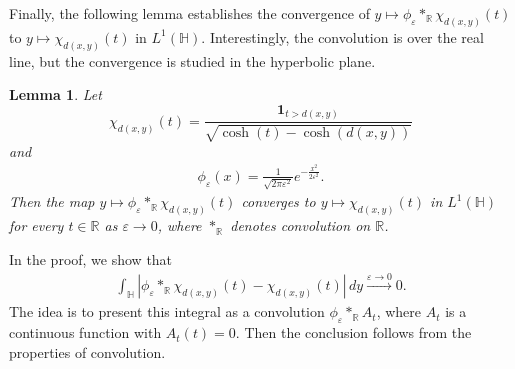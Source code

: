 \documentclass[11pt,twoside,reqno]{amsart} \usepackage{a4wide} \usepackage[T1]{fontenc} \usepackage[utf8]{inputenc} \usepackage{soul}  \usepackage{amsmath} \usepackage{amsfonts} \usepackage{amssymb} \usepackage{mathtools} \usepackage{amsthm} \usepackage{xcolor} \usepackage{graphicx} \usepackage{hyperref} \usepackage{standalone} \usepackage{esint} \usepackage{comment} \usepackage[left=2.3cm,top=3cm,right=2.3cm]{geometry} \usepackage{bm} \usepackage{svg} \usepackage{float} \numberwithin{equation}{section} \theoremstyle{plain} \newtheorem{thm}{Theorem}[section] \newtheorem{theorem}[thm]{Theorem} \newtheorem*{theorem*}{Theorem}\newtheorem{conj}[thm]{Conjecture} \newtheorem{lemma}[thm]{Lemma} \newtheorem{prop}[thm]{Proposition} \newtheorem{proposition}[thm]{Proposition} \newtheorem{cor}[thm]{Corollary} \newtheorem{question}[thm]{Question} \newtheorem{corollary}[thm]{Corollary} \newtheorem{assumption}[thm]{Assumption} \theoremstyle{definition} \newtheorem{defn}[thm]{Definition} \newtheorem{choice}[thm]{Choice} \newtheorem{definition}[thm]{Definition} \newtheorem{ex}[thm]{Example} \newtheorem{notation}[thm]{Notation} \newtheorem*{ack}{Acknowledgements} \theoremstyle{remark} \newtheorem{remark}[thm]{Remark} \newtheorem{bigremark}[thm]{Remark} \usepackage{xcolor} \newcommand{\red}[1]{ {\color{Red}#1} } \newcommand{\blue}[1]{ {\color{Blue}#1} } \author{Kai Hippi} \address{Aalto University, Espoo, Finland} \email{kai.hippi@aalto.fi}
\begin{document}
Finally, the following lemma establishes the convergence of $y \mapsto \phi_{\varepsilon} \ast_{\mathbb{R}} \chi_{d(x,y)}(t)$ to $y \mapsto \chi_{d(x,y)}(t)$ in $L^1(\mathbb{H})$. Interestingly, the convolution is over the real line, but the convergence is studied in the hyperbolic plane.

\begin{lemma}
\label{Lmm: Hard convolution}
Let
$$
\chi_{d(x,y)}(t) = \frac{\mathbf{1}_{t > d(x,y)}}{\sqrt{\cosh(t) - \cosh(d(x,y))}}
$$
and
\begin{align*}
	\phi_\varepsilon(x) = \frac{1}{\sqrt{2\pi \varepsilon^{2}}} e^{-\frac{x^2}{2\varepsilon^2}}.
\end{align*}
Then the map $y \mapsto \phi_\varepsilon \ast_\mathbb{R} \chi_{d(x,y)}(t)$ converges to $y \mapsto \chi_{d(x,y)}(t)$ in $L^1(\mathbb{H})$ for every $t \in \mathbb{R}$ as $\varepsilon \to 0$, where $\ast_\mathbb{R}$ denotes convolution on $\mathbb{R}$.
\end{lemma}

In the proof, we show that
\begin{align*}
	\int_\mathbb{H} \left| \phi_\varepsilon \ast_\mathbb{R} \chi_{d(x,y)}(t) - \chi_{d(x,y)}(t) \right| \, dy \xrightarrow{\varepsilon \to 0} 0.
\end{align*}
The idea is to present this integral as a convolution $\phi_{\varepsilon} \ast_{\mathbb{R}} A_{t}$, where $A_{t}$ is a continuous function with $A_{t}(t) = 0$. Then the conclusion follows from the properties of convolution.
\end{document}
